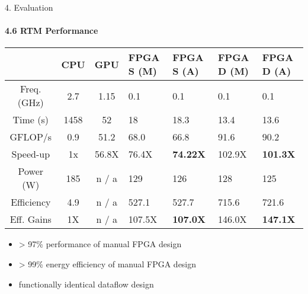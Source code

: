 \begin{frame}{4. Evaluation}
  \framesubtitle{4.6 RTM Performance}

  {\small
    \begin{table}
      \renewcommand{\arraystretch}{1.4}
      \begin{tabular}{c|c|c|p{1cm}|p{1cm}|p{1cm}|p{1cm}}
                   & \textbf{CPU} & \textbf{GPU} & \textbf{FPGA S (M)} & \textbf{FPGA S (A)} & \textbf{FPGA D (M)} & \textbf{FPGA D (A)} \\
        \hline \hline
        Freq.(GHz) & 2.7          & 1.15         & 0.1                 & 0.1                 & 0.1                 & 0.1                 \\
        Time (s)   & 1458         & 52           & 18                  & 18.3                & 13.4                & 13.6                \\
        GFLOP/s    & 0.9          & 51.2         & 68.0                & 66.8                & 91.6                & 90.2              \\
        Speed-up   & 1x           & 56.8X        & 76.4X               & \textbf{74.22X}              & 102.9X              & \textbf{101.3X}              \\
        Power (W)  & 185          & n / a        & 129                 & 126                 & 128                 & 125                 \\
        Efficiency & 4.9          & n / a        & 527.1               & 527.7               & 715.6               & 721.6               \\
        Eff. Gains & 1X           & n / a        & 107.5X              & \textbf{107.0X}              & 146.0X              & \textbf{147.1X}              \\
      \end{tabular}
    \end{table}
  }

  \begin{itemize}
  \item > 97\% performance of manual FPGA design
  \item > 99\% energy efficiency of manual FPGA design
  \item functionally identical dataflow design
  \end{itemize}
\end{frame}


